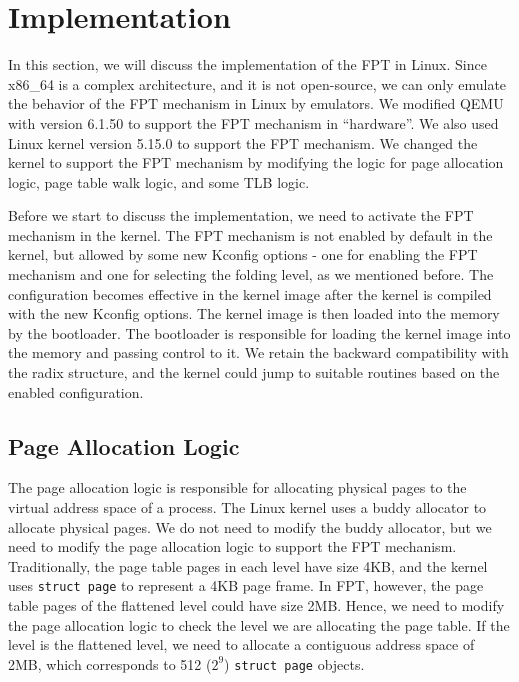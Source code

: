 \section{Implementation}


In this section, we will discuss the implementation of the FPT in Linux. Since x86\_64 is a complex architecture, and it is not open-source, we can only emulate the behavior of the FPT mechanism in Linux by emulators. We modified QEMU with version 6.1.50 to support the FPT mechanism in ``hardware''. We also used Linux kernel version 5.15.0 to support the FPT mechanism. We changed the kernel to support the FPT mechanism by modifying the logic for page allocation logic, page table walk logic, and some TLB logic.

Before we start to discuss the implementation, we need to activate the FPT mechanism in the kernel. The FPT mechanism is not enabled by default in the kernel, but allowed by some new Kconfig options - one for enabling the FPT mechanism and one for selecting the folding level, as we mentioned before. The configuration becomes effective in the kernel image after the kernel is compiled with the new Kconfig options. The kernel image is then loaded into the memory by the bootloader. The bootloader is responsible for loading the kernel image into the memory and passing control to it. We retain the backward compatibility with the radix structure, and the kernel could jump to suitable routines based on the enabled configuration.

\subsection{Page Allocation Logic}

The page allocation logic is responsible for allocating physical pages to the virtual address space of a process. The Linux kernel uses a buddy allocator to allocate physical pages. We do not need to modify the buddy allocator, but we need to modify the page allocation logic to support the FPT mechanism. Traditionally, the page table pages in each level have size 4KB, and the kernel uses \texttt{struct page} to represent a 4KB page frame. In FPT, however, the page table pages of the flattened level could have size 2MB. Hence, we need to modify the page allocation logic to check the level we are allocating the page table. If the level is the flattened level, we need to allocate a contiguous address space of 2MB, which corresponds to 512 ($2^9$) \texttt{struct page} objects.